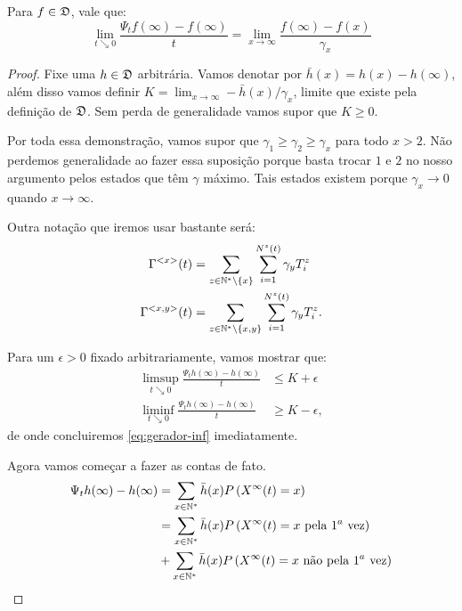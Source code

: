 \begin{proposicao}
  \label{prop:gerador-inf}
  Para $f \in {\mathfrak{D}}$, vale que:
  \begin{equation}
    \label{eq:gerador-inf}
    \lim_{t \searrow 0} \frac{\Psi_t f(\infty) - f(\infty)}{t} =
    \lim_{x \to \infty} \frac{f(\infty) - f(x)}{\gamma_x}
  \end{equation}
\end{proposicao}
\begin{proof}
  Fixe uma $h \in {\mathfrak{D}}$ arbitrária. Vamos denotar por $\bar{h}(x) =
  h(x) - h(\infty)$, além disso vamos definir $K = \lim_{x \to \infty}
  -\bar{h}(x)/\gamma_x$, limite que existe pela definição de
  ${\mathfrak{D}}$. Sem perda de generalidade vamos supor que $K \geq 0$.

  Por toda essa demonstração, vamos supor que $\gamma_1 \geq \gamma_2
  \geq \gamma_x$ para todo $x > 2$. Não perdemos generalidade ao fazer
  essa suposição porque basta trocar $1$ e $2$ no nosso argumento pelos
  estados que têm $\gamma$ máximo. Tais estados existem porque $\gamma_x
  \to 0$ quando $x \to \infty$.

  Outra notação que iremos usar bastante será:
  \begin{align*}
    \Gamma^{<x>}(t) &= \sum_{z\in{\mathbb{N^*}}\setminus\{x\}} \sum_{i =
      1}^{N^z(t)} \gamma_y T^z_i \\
    \Gamma^{<x, y>}(t) &= \sum_{z\in{\mathbb{N^*}}\setminus\{x,y\}} \sum_{i =
      1}^{N^z(t)} \gamma_y T^z_i .
  \end{align*}


  Para um $\epsilon > 0$ fixado arbitrariamente, vamos mostrar que:
  \begin{align}
    \label{eq:gerador-inf-sup}
    \limsup_{t \searrow 0} \frac{\Psi_t h(\infty) - h(\infty)}{t} 
    &\leq K + \epsilon\\
    \label{eq:gerador-inf-inf}
    \liminf_{t \searrow 0} \frac{\Psi_t h(\infty) - h(\infty)}{t} 
    &\geq K - \epsilon,
  \end{align}
  de onde concluiremos \eqref{eq:gerador-inf} imediatamente.

  Agora vamos começar a fazer as contas de fato.
  \begin{align*}
    \Psi_t h (\infty) - h(\infty) &=
    \sum_{x \in {\mathbb{N^*}}} \bar{h}(x) P\left( X^\infty(t) = x \right)\\
    &= 
    \sum_{x \in {\mathbb{N^*}}} \bar{h}(x) P\left( X^\infty(t) = x \text{ pela } 1^{a}
        \text{ vez}\right)\\
    &+ \sum_{x \in {\mathbb{N^*}}} \bar{h}(x) P\left( X^\infty(t) = x \text{ não pela
      } 1^a \text{ vez}\right)
  \end{align*}


\end{proof}
